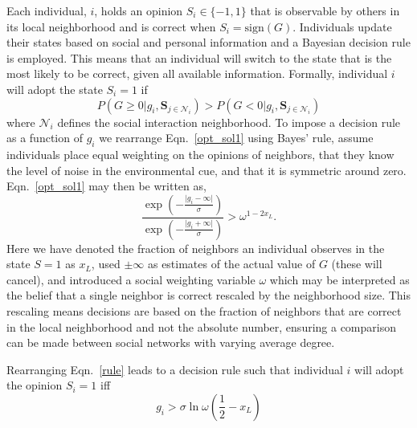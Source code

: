 \documentclass[3p,number,sort&compress,times]{elsarticle}
\begin{document}
Each individual, $i$, holds an opinion $S_i \in \{ -1,1\}$ that is observable by others in its local neighborhood and is correct when $S_i = \mbox{sign}(G)$. Individuals update their states based on social and personal information and a Bayesian decision rule \cite{nitzan1982optimal,perez2011collective, Perreault, torney2015} is employed. This means that an individual will switch to the state that is the most likely to be correct, given all available information. Formally, individual $i$ will adopt the state $S_i=1$ if
\begin{equation}
 P\left(G \ge 0\big| g_i, \mathbf{S}_{j\in \mathcal{N}_i}\right)  > P\left(G < 0\big| g_i, \mathbf{S}_{j\in \mathcal{N}_i}\right)
\label{opt_sol1}
\end{equation}
where $\mathcal{N}_i$ defines the social interaction neighborhood. To impose a decision rule as a function of $g_i$ we rearrange Eqn.~\ref{opt_sol1} using Bayes' rule, assume individuals place equal weighting on the opinions of neighbors, that they know the level of noise in the environmental cue, and that it is symmetric around zero. Eqn.~\ref{opt_sol1} may then be written as,
\begin{equation}
\frac{\exp{ \left( - \frac{\vert g_i -  \infty \vert}{\sigma} \right)}}{\exp{ \left( - \frac{\vert g_i + \infty \vert}{\sigma} \right)}} > \omega^{1-2x_L}.
\label{rule}
\end{equation}
Here we have denoted the fraction of neighbors an individual observes in the state $S=1$ as $x_L$, used $\pm \infty$ as estimates of the actual value of $G$ (these will cancel), and introduced a social weighting variable $\omega$ which may be interpreted as the belief that a single neighbor is correct rescaled by the neighborhood size. This rescaling means decisions are based on the fraction of neighbors that are correct in the local neighborhood and not the absolute number, ensuring a comparison can be made between social networks with varying average degree.

Rearranging Eqn.~\ref{rule} leads to a decision rule such that individual $i$ will adopt the opinion $S_i = 1$ iff
\begin{equation}
g_i >  \sigma\ln\omega  \left(\frac{1}{2}-x_L\right) 
\label{opt_rule}
\end{equation}


\end{document}
